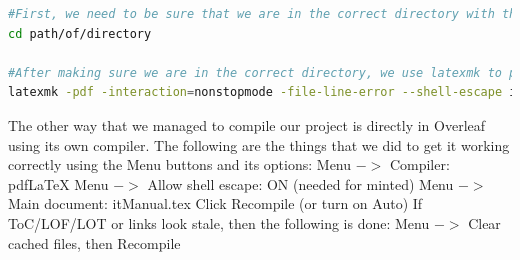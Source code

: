 \begin{lstlisting}[style=linuxstyle, language=bash]
#First, we need to be sure that we are in the correct directory with the use of cd.
cd path/of/directory

#After making sure we are in the correct directory, we use latexmk to put multiple other commands into one simple one.
latexmk -pdf -interaction=nonstopmode -file-line-error --shell-escape itManual.tex
\end{lstlisting}
\par\noindent
The other way that we managed to compile our project is directly in Overleaf using its own compiler. The following are the things that we did to get it working correctly using the Menu buttons and its options:
\newline \newline
Menu $->$ Compiler: pdfLaTeX\newline
Menu $->$ Allow shell escape: ON (needed for minted)\newline 
Menu $->$ Main document: itManual.tex\newline 
Click Recompile (or turn on Auto) \newline 
If ToC/LOF/LOT or links look stale, then the following is done: Menu $->$ Clear cached files, then Recompile
